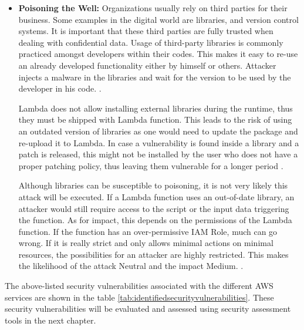 \begin{itemize}
    \item \textbf{Poisoning the Well:} Organizations usually rely on third parties for their business.
    Some examples
    in the
    digital world are libraries, and version control systems.
    It is important that
    these third parties are fully trusted when dealing with confidential data.
    Usage of third-party libraries is
    commonly practiced amongst developers within their codes.
    This makes it easy to re-use an already developed
    functionality either by himself or others.
    Attacker injects a malware in the libraries and wait for the version to be used by the developer in his code.
    \cite{71}.

    Lambda does not allow installing external libraries
    during the runtime, thus they must be shipped with Lambda function.
    This leads to the risk of using an outdated version of libraries as one would need to update the package and re-upload it to Lambda.
    In case a vulnerability is found inside a library and a patch is released, this might not be installed by the
    user who does not have a proper patching policy, thus
    leaving them vulnerable for a longer period \cite{72}.

    Although libraries can be susceptible to poisoning, it is not very likely this attack will be executed.
    If a Lambda function uses an out-of-date library, an attacker would still require access to the script or the input data triggering the function.
    As for impact, this depends on the permissions of the Lambda function.
    If the function has an over-permissive IAM Role, much can go wrong.
    If it is really strict and only allows minimal actions on minimal resources, the possibilities for an attacker are highly restricted.
    This makes the likelihood of the attack Neutral and the impact Medium. \cite{64}.
\end{itemize}

\par The above-listed security vulnerabilities associated
with the different AWS services are shown in the table
\ref{tab:identifiedsecurityvulnerabilities}.
These
security vulnerabilities will be evaluated and assessed
using security
assessment tools in the next chapter.

